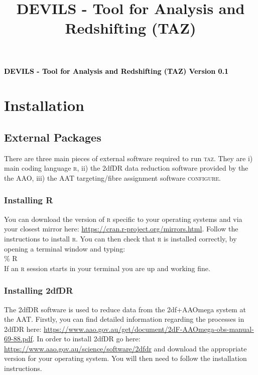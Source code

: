 \documentclass[12pt]{article}
\begin{document}
\title{DEVILS - Tool for Analysis and Redshifting (TAZ) }

\begin{center}
\Large {\textcolor{black}{\textbf{DEVILS - Tool for Analysis and Redshifting (TAZ) Version 0.1}}}
\end{center}
\normalsize


\section{Installation}

\subsection{External Packages}

There are three main pieces of external software required to run \textsc{taz}. They are i) main coding language \textsc{r}, ii) the 2dfDR data reduction software provided by the the AAO, iii) the AAT targeting/fibre assignment software \textsc{configure}. 

\subsubsection{Installing R}

You can download the version of \textsc{r} specific to your operating systems and via your closest mirror here: \url{https://cran.r-project.org/mirrors.html}. Follow the instructions to install \textsc{r}. You can then check that \textsc{r} is installed correctly, by opening a terminal window and typing: \\


\hspace{10mm} \% R\\

If an \textsc{r} session starts in your terminal you are up and working fine.

\subsubsection{Installing 2dfDR}

The 2dfDR software is used to reduce data from the 2df+AAOmega system at the AAT. Firstly, you can find detailed information regarding the processes in 2dfDR here:  \url{https://www.aao.gov.au/get/document/2dF-AAOmega-obs-manual-69-88.pdf}. In order to install 2dfDR go here: \url{https://www.aao.gov.au/science/software/2dfdr} and download the appropriate version for your operating system. You will then need to follow the installation instructions.
\end{document}
